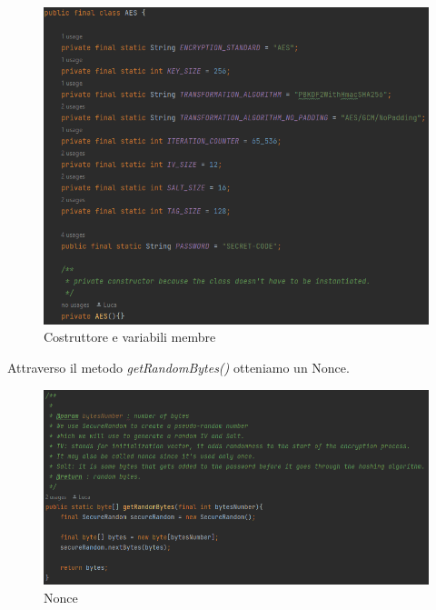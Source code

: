 \begin{figure}[H]
	\centering
	\includegraphics[width=1\textwidth, height=1\textheight, keepaspectratio]{./images/code/java/constructor_and_member_variables.PNG}
	\caption{Costruttore e variabili membre}
	\label{fig:constructor_and_member_variables}
\end{figure}


\textsf{\small Attraverso il metodo \emph{getRandomBytes()} otteniamo un Nonce.}

\begin{figure}[H]
	\centering
	\includegraphics[width=1\textwidth, height=1\textheight, keepaspectratio]{./images/code/java/nonce_getRandomBytes.PNG}
	\caption{Nonce}
	\label{fig:nonce_getRandomBytes}
\end{figure}


